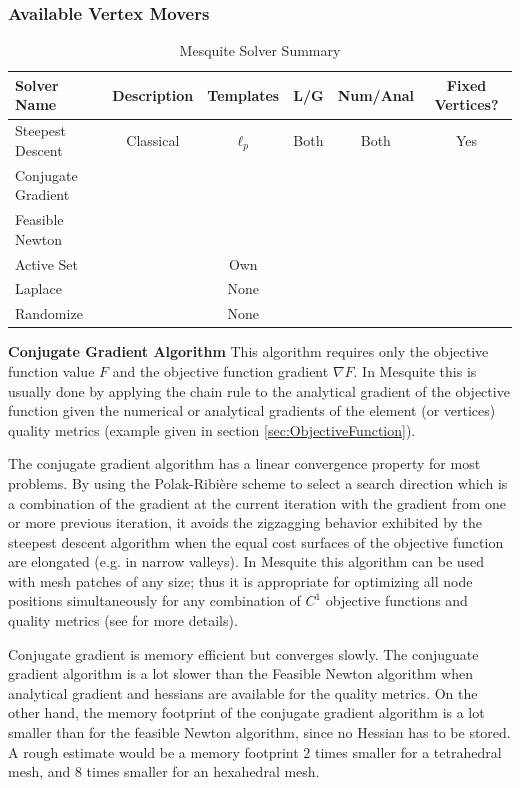 \subsubsection{Available Vertex Movers}

\begin{table}[h]
\begin{center}
\begin{tabular}{|l|c|c|c|c|c|}
\hline
Solver Name & Description & Templates & L/G & Num/Anal & Fixed Vertices? \\ \hline
Steepest Descent & Classical & $\ell_p$ & Both & Both & Yes \\
Conjugate Gradient & & & & & \\
Feasible Newton & & & & & \\
Active Set & & Own & & & \\
Laplace & & None & & & \\
Randomize & & None & & & \\
\hline
\end{tabular}
\caption{\label{Solvers} Mesquite Solver Summary}
\end{center}
\end{table}

{\bf Conjugate Gradient Algorithm } \newline
\label{append_conjgrad}
This algorithm requires only
the objective function value $F$ and the objective function gradient $\nabla F$. 
In Mesquite this is usually done by applying the chain rule to the
analytical gradient of the objective function given the numerical or
analytical gradients of the element (or vertices) quality metrics 
(example given in section \ref{sec:ObjectiveFunction}). 

The conjugate gradient algorithm
has a linear convergence property for most problems. By using the
Polak-Ribi\`ere scheme to select a search direction which is a
combination of the gradient at the current iteration with the gradient
from one or more previous iteration, it avoids the zigzagging behavior
exhibited by the steepest descent algorithm when the equal cost
surfaces of the objective function are elongated (e.g. in narrow
valleys). In Mesquite this algorithm can be used with mesh patches of
any size; thus it is appropriate for optimizing all node positions 
simultaneously for any combination of $C^1$ objective functions and
quality metrics (see \cite{FeasNewt} for more details). 

Conjugate gradient is memory efficient but converges slowly.
The conjuguate gradient algorithm is a lot slower than the Feasible Newton algorithm
when analytical gradient and hessians are available for the quality metrics. On the other hand, the
memory footprint of the conjugate gradient algorithm is a lot smaller than for the feasible Newton 
algorithm, since no Hessian has to be stored. A rough estimate would be a memory 
footprint 2 times smaller for a tetrahedral mesh, and 8 times smaller for an hexahedral mesh.  
\newline

